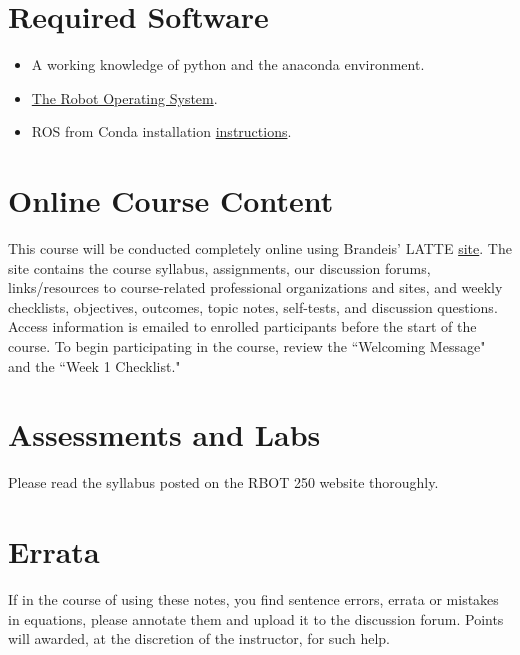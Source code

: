 \section{Required Software}
	
	\begin{itemize}
	\item A working knowledge of python and the anaconda environment.
	\item \href{https://www.ros.org/}{The Robot Operating System}.
	\item ROS from Conda installation \href{ https://medium.com/@wolfv/ros-on-conda-forge-dca6827ac4b6}{instructions}.
	\end{itemize}

\section{Online Course Content}
%
This course will be conducted completely online using Brandeis’ LATTE \href{http://moodle2.brandeis.edu}{site}. The site contains the course syllabus, assignments, our discussion forums, links/resources to course-related professional organizations and sites, and weekly checklists, objectives, outcomes, topic notes, self-tests, and discussion questions.  Access information is emailed to enrolled participants before the start of the course.   To begin participating in the course, review the ``Welcoming Message" and the ``Week 1 Checklist."

\section{Assessments and Labs}

Please read the syllabus posted on the RBOT 250 website thoroughly.

\section{Errata}

If in the course of using these notes, you find sentence errors, errata or mistakes in equations, please annotate them and upload it to the discussion forum. Points will awarded, at the discretion of the instructor, for such help.